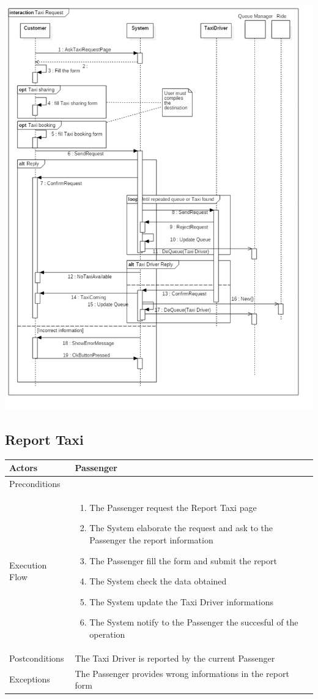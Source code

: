\documentclass[english]{article}
\begin{document}
\includegraphics[width=\textwidth]{TaxiRequest}

\subsection{Report Taxi}

\begin{tabular}{lp{8cm}}
\hline
Actors & Passenger \\
\hline
Preconditions & \\
\hline
Execution Flow &  
		\begin{enumerate}
			\item The Passenger request the Report Taxi page
			\item The System elaborate the request and ask to the Passenger the report information
			\item The Passenger fill the form and submit the report
			\item The System check the data obtained
			\item The System update the Taxi Driver informations
			\item The System notify to the Passenger the succesful of the operation
		\end{enumerate} 
	\\ 
\hline
Postconditions & The Taxi Driver is reported by the current Passenger \\
\hline
Exceptions & The Passenger provides wrong informations in the report form
\end{tabular}
\end{document}
